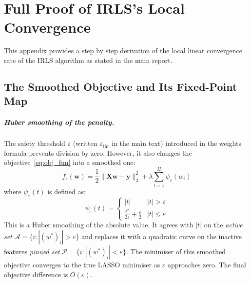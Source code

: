 \chapter{Full Proof of IRLS's Local Convergence}
\label{app:irls-local-conv-proof}
This appendix provides a step by step derivation of the local linear convergence rate of the IRLS algorithm as stated in the main report.

\section{The Smoothed Objective and Its Fixed-Point Map}
\label{app:sec:smooth}

\paragraph{Huber smoothing of the penalty.}
The safety threshold $\varepsilon$ (written $\varepsilon_{\mathrm{thr}}$ in the main text) introduced in the weights formula prevents division by zero. However, it also changes the objective~\eqref{eq:obj_fun} into a smoothed one:
\begin{equation}
    f_\varepsilon(\mathbf{w})
    = \frac{1}{2}\|\mathbf{X}\mathbf{w}-\mathbf{y}\|_2^2
    + \lambda\sum_{i=1}^{H}\psi_\varepsilon(w_i)
    \label{app:eq:smooth_obj}
\end{equation}
where $\psi_\varepsilon(t)$ is defined as:
\begin{equation}
    \psi_\varepsilon(t)
    =\begin{cases}
        |t| & |t|>\varepsilon\\
        \frac{t^2}{2\varepsilon}+\frac{\varepsilon}{2} & |t|\le\varepsilon
    \end{cases}
    \label{app:eq:huber}
\end{equation}
This is a Huber smoothing of the absolute value. It agrees with $|t|$ on the \emph{active set} $\mathcal{A}=\{i:|(w^*)_i|>\varepsilon\}$ and replaces it with a quadratic curve on the inactive features \emph{pinned set} $\mathcal{P}=\{i:|(w^*)_i|<\varepsilon\}$. 
The minimiser of this smoothed objective converges to the true LASSO minimiser as $\varepsilon$ approaches zero. The final objective difference is $O(\varepsilon)$.

